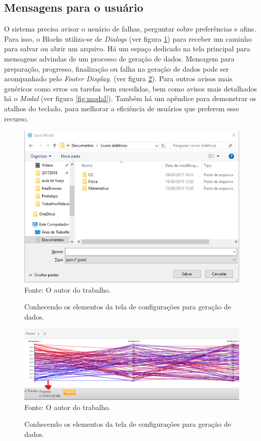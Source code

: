 \documentclass[
	12pt,				%
	openright,			%
	oneside,			%
	a4paper,			%
	english,			%
	brazil				%
	]{abntex2}
\begin{document}
		\subsection{Mensagens para o usuário}
			O sistema precisa avisar o usuário de falhas, perguntar sobre preferências e afins.
			Para isso, o Blocks utiliza-se de \emph{Dialogs} (ver figura \ref{fig:dialog}) para receber um caminho para salvar ou abrir um arquivo.
			Há um espaço dedicado na tela principal para mensagens advindas de um processo de geração de dados.
			Mensagem para preparação, progresso, finalização ou falha na geração de dados pode ser acompanhado pelo \emph{Footer Display}. (ver figura \ref{fig:SDvisor}).
			Para outros avisos mais genéricos como erros ou tarefas bem sucedidas, bem como avisos mais detalhados há o \emph{Modal} (ver figura \ref{fig:modal}).
			Também há um apêndice para demonstrar os atalhos do teclado, para melhorar a eficiência de usuários que preferem esse recurso.
			\begin{figure}[h]
				\centering
				\caption{Conhecendo os elementos da tela de configurações para geração de dados.}
				\includegraphics[width=\linewidth]{./figures/prototipo/dialog.png}
				\label{fig:dialog}
				\footnotesize Fonte: O autor do trabalho.
			\end{figure}
			\begin{figure}[h]
				\centering
				\caption{Conhecendo os elementos da tela de configurações para geração de dados.}
				\includegraphics[width=\linewidth]{./figures/prototipo/SDvisor.png}
				\label{fig:SDvisor}
				\footnotesize Fonte: O autor do trabalho.
			\end{figure}
\end{document}

